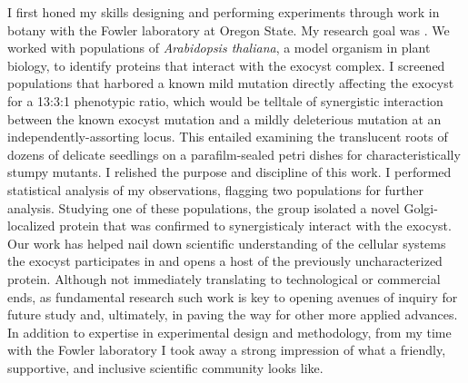 I first honed my skills designing and performing experiments through work in botany with the Fowler laboratory at Oregon State.
My research goal was .
We worked with populations of \textit{Arabidopsis thaliana}, a model organism in plant biology, to identify proteins that interact with the exocyst complex.
I screened populations that harbored a known mild mutation directly affecting the exocyst for a 13:3:1 phenotypic ratio, which would be telltale of synergistic interaction between the known exocyst mutation and a mildly deleterious mutation at an independently-assorting locus.
This entailed examining the translucent roots of dozens of delicate seedlings on a parafilm-sealed petri dishes for characteristically stumpy mutants.
I relished the purpose and discipline of this work.
I performed statistical analysis of my observations, flagging two populations for further analysis.
Studying one of these populations, the group isolated a novel Golgi-localized protein that was confirmed to synergisticaly interact with the exocyst.
Our work has helped nail down scientific understanding of the cellular systems the exocyst participates in and opens a host of the previously uncharacterized protein.
Although not immediately translating to technological or commercial ends, as fundamental research such work is key to opening avenues of inquiry for future study and, ultimately, in paving the way for other more applied advances.
In addition to expertise in experimental design and methodology, from my time with the Fowler laboratory I took away a strong impression of what a friendly, supportive, and inclusive scientific community looks like.

